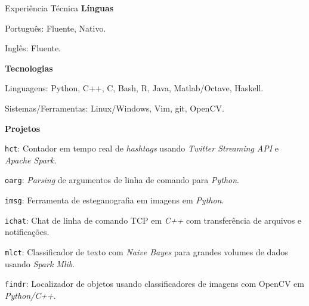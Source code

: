 \documentclass[8pt]{resume}
\newcommand{\tit}[1]{\textit{#1}}
\newcommand{\tbf}[1]{\textbf{#1}}
\newcommand{\ttt}[1]{\texttt{#1}}
\begin{document}
\begin{rSection}{Experiência Técnica}
\tbf{Línguas}
\begin{rSubsection}{}{}{}{}
    \item Português: Fluente, Nativo.
    \item Inglês: Fluente.
\end{rSubsection}

\tbf{Tecnologias}
\begin{rSubsection}{}{}{}{}
    \item Linguagens: Python, C++, C, Bash, R, Java, Matlab/Octave, Haskell.
    \item Sistemas/Ferramentas: Linux/Windows, Vim, git, OpenCV.
\end{rSubsection}

\tbf{Projetos}
\begin{rSubsection}{}{}{}{}
\item \ttt{hct}: Contador em tempo real de \tit{hashtags} usando \tit{Twitter
    Streaming API} e \tit{Apache Spark.}
\item \ttt{oarg}: \tit{Parsing} de argumentos de linha de comando para \tit{Python}.
\item \ttt{imsg}: Ferramenta de esteganografia em imagens em \tit{Python}.
\item \ttt{ichat}: Chat de linha de comando TCP em \tit{C++} com
    transferência de arquivos e notificações.
\item \ttt{mlct}: Classificador de texto com \tit{Naive Bayes} para grandes
    volumes de dados usando \tit{Spark Mlib}.
\item \ttt{findr}: Localizador de objetos usando classificadores de imagens
    com OpenCV em \tit{Python/C++}.
\end{rSubsection}
\end{rSection}
\end{document}
